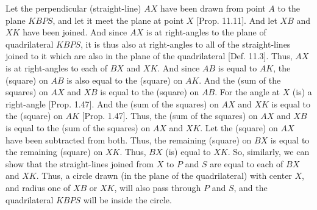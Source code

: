 \begin{Parallel}{}{}
{Let the perpendicular (straight-line) $AX$ have been drawn from point $A$ to the plane $KBPS$, and let it meet the
plane at point $X$ [Prop. 11.11]. And let $XB$ and $XK$ have been joined. And since $AX$ is at right-angles to the plane
of quadrilateral $KBPS$, it is thus also at right-angles to all of the  straight-lines joined to it which are also in the plane of the quadrilateral
[Def. 11.3]. Thus, $AX$ is at right-angles to each of $BX$ and $XK$. And since $AB$ is equal
to $AK$, the (square) on $AB$ is also equal to the (square) on $AK$. And the (sum of the
squares) on $AX$ and $XB$ is equal to the (square) on $AB$. For the angle at $X$ (is) a right-angle [Prop. 1.47]. And the (sum of the squares) on $AX$ and $XK$ is equal to the (square) on
$AK$ [Prop. 1.47]. Thus, the (sum of the squares) on $AX$ and $XB$
is equal to the (sum of the squares) on $AX$ and $XK$. Let the (square) on $AX$ have been subtracted from both. Thus, the
remaining (square) on $BX$ is equal to the remaining (square) on $XK$. Thus, $BX$ (is) equal to $XK$. So, similarly,
we can show that  the straight-lines joined from $X$ to $P$ and $S$ are equal to each of $BX$ and $XK$.
Thus, a circle drawn (in the plane of the quadrilateral) with center $X$, and radius one of $XB$ or $XK$, will
also pass through $P$ and $S$, and the quadrilateral $KBPS$ will be inside the circle.

}
\end{Parallel}
